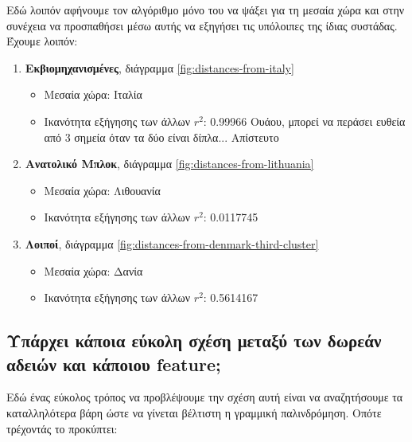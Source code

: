 \documentclass[a4paper,twoside,10pt]{article}
\begin{document}
Εδώ λοιπόν αφήνουμε τον αλγόριθμο μόνο του να ψάξει για τη μεσαία χώρα και στην συνέχεια να προσπαθήσει μέσω αυτής να εξηγήσει τις υπόλοιπες της ίδιας συστάδας. Έχουμε λοιπόν:
\begin{enumerate}
	\item \textbf{Εκβιομηχανισμένες}, διάγραμμα \ref{fig:distances-from-italy}
	\begin{itemize}
		\item Μεσαία χώρα: Ιταλία
		\item Ικανότητα εξήγησης των άλλων $r^2$: 0.99966 Ουάου, μπορεί να περάσει ευθεία από 3 σημεία όταν τα δύο είναι δίπλα... Απίστευτο
	\end{itemize}
	\item \textbf{Ανατολικό Μπλοκ}, διάγραμμα \ref{fig:distances-from-lithuania}
		\begin{itemize}
		\item Μεσαία χώρα: Λιθουανία
		\item Ικανότητα εξήγησης των άλλων $r^2$: 0.0117745
	\end{itemize}
	\item \textbf{Λοιποί}, διάγραμμα \ref{fig:distances-from-denmark-third-cluster}
		\begin{itemize}
		\item Μεσαία χώρα: Δανία
		\item Ικανότητα εξήγησης των άλλων $r^2$: 0.5614167
	\end{itemize}
\end{enumerate}

\subsection{Υπάρχει κάποια εύκολη  σχέση μεταξύ των δωρεάν αδειών και κάποιου feature;}
Εδώ ένας εύκολος τρόπος να προβλέψουμε την σχέση αυτή είναι να αναζητήσουμε τα καταλληλότερα βάρη ώστε να γίνεται βέλτιστη η γραμμική παλινδρόμηση. Οπότε τρέχοντάς το προκύπτει:
\end{document}

